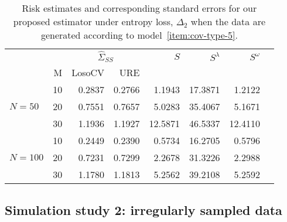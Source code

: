 \documentclass[12pt]{article}
\theoremstyle{definition}
\begin{document}

\begin{table}[H] \label{table:simulation-1-entropy-loss-sigma-5}
\centering
\caption{Risk estimates and corresponding standard errors for our proposed estimator under entropy loss, $\Delta_2$ when the data are generated according to model~\ref{item:cov-type-5}.} 
\begin{tabular}{l|r|rrrrrr}
&  & \multicolumn{2}{c}{$\hat{\Sigma}_{SS}$} & $S$ & $S^\lambda$ & $S^\omega$ \\ 
&M & \mbox{LosoCV} & \mbox{URE} &  \\ 
  \hline
 &    10 & 0.2837 & 	  0.2766	& 1.1943 &  17.3871 & 1.2122 \\ 
$N = 50$&    20 & 0.7551& 0.7657& 5.0283& 35.4067 & 5.1671 \\ 
  &    30 & 1.1936 & 1.1927& 12.5871& 46.5337 & 12.4110  \\ \hdashline
 &    10 & 0.2449 &  0.2390 & 0.5734 & 16.2705 & 0.5796\\ 
  $N = 100$ &    20 & 0.7231 & 0.7299 & 2.2678& 31.3226 & 2.2988 \\ 
   &    30 & 1.1780 & 1.1813 & 5.2562 & 39.2108 & 5.2592 \\
  \end{tabular}
\end{table}


\subsection{Simulation study 2: irregularly sampled data}

\setlength{\dashlinedash}{0.5pt}
\setlength{\dashlinegap}{1pt}
\setlength{\arrayrulewidth}{0.2pt}
\end{document}
